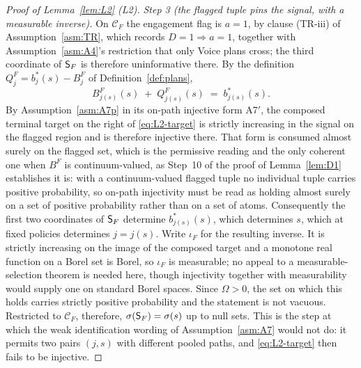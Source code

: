 \begin{proof}[Proof of Lemma~\ref{lem:L2} (L2)]
\emph{Step 3 (the flagged tuple pins the signal, with a measurable inverse).} On $\mathcal C_F$ the
engagement flag is $a=1$, by clause (TR-iii) of Assumption~\ref{asm:TR}, which records
$D = 1 \Rightarrow a = 1$, together with Assumption~\ref{asm:A4}'s restriction that only Voice plans
cross; the third coordinate of $\mathsf{S}_F$ is therefore uninformative there. By the definition
$Q_j^F = b_j^*(s) - B_j^F$ of Definition~\ref{def:plans},
\begin{equation}
\label{eq:L2-target}
B^F_{j(s)}(s) \;+\; Q^F_{j(s)}(s) \;=\; b^*_{j(s)}(s).
\end{equation}
By Assumption~\ref{asm:A7p} in its on-path injective form A7$'$, the composed terminal target on the
right of \eqref{eq:L2-target} is strictly increasing in the signal on the flagged region and is
therefore injective there. That form is consumed almost surely on the flagged set, which is the
permissive reading and the only coherent one when $B^F$ is continuum-valued, as Step~10 of the proof
of Lemma~\ref{lem:D1} establishes it is: with a continuum-valued flagged tuple no individual tuple
carries positive probability, so on-path injectivity must be read as holding almost surely on a set
of positive probability rather than on a set of atoms. Consequently the first two coordinates of
$\mathsf{S}_F$ determine $b^*_{j(s)}(s)$, which determines $s$, which at fixed policies determines
$j = j(s)$. Write $\iota_F$ for the resulting inverse. It is strictly increasing on the image of the
composed target and a monotone real function on a Borel set is Borel, so $\iota_F$ is measurable; no
appeal to a measurable-selection theorem is needed here, though injectivity together with
measurability would supply one on standard Borel spaces. Since $\Omega > 0$, the set on which this
holds carries strictly positive probability and the statement is not vacuous. Restricted to
$\mathcal C_F$, therefore, $\sigma(\mathsf{S}_F) = \sigma(s)$ up to null sets. This is the step at which the
weak identification wording of Assumption~\ref{asm:A7} would not do: it permits two pairs $(j,s)$
with different pooled paths, and \eqref{eq:L2-target} then fails to be injective.


\end{proof}
